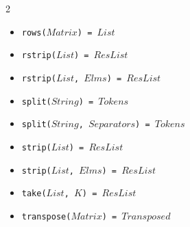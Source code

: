 \documentclass[10pt]{article}
\newcommand{\ignore}[1]{}
\begin{document}
\begin{multicols}{2}
\begin{scriptsize}
\begin{itemize}
    \item \texttt{rows($Matrix$) = $List$}
    \item \texttt{rstrip($List$) = $ResList$ } 
    \item \texttt{rstrip($List$, $Elms$) = $ResList$ }
    \item \texttt{split($String$) = $Tokens$ } 
    \item \texttt{split($String$, $Separators$) = $Tokens$ }
    \item \texttt{strip($List$) = $ResList$ }
    \item \texttt{strip($List$, $Elms$) = $ResList$ } 
    \item \texttt{take($List$, $K$) = $ResList$} 
    \item \texttt{transpose($Matrix$) = $Transposed$}
\end{itemize}
\end{scriptsize}
\ignore{
}
\end{multicols}
\end{document}
